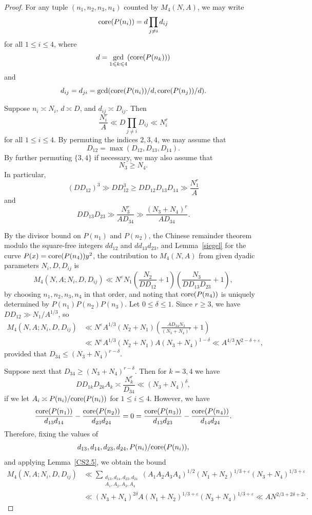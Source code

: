 \documentclass[reqno, 12pt]{amsart}
\theoremstyle{plain}
\theoremstyle{definition}
\theoremstyle{remark}
\renewcommand{\le}{\leqslant}
\renewcommand{\ge}{\geqslant}
\newcommand{\co}{\textnormal{core}}
\begin{document}
\begin{proof}
For any tuple $(n_1,n_2,n_3,n_4)$ counted by $M_4(N,A)$, we may write
$$\co(P(n_i)) = d \prod_{j\ne i} d_{ij}$$
for all $1\le i\le 4$,
where $$d = \gcd_{1\le k\le 4}(\co(P(n_k)))$$
and $$d_{ij} = d_{ji} = \gcd(\co(P(n_i))/d, \co(P(n_j))/d).$$

Suppose $n_i\asymp N_i$, $d\asymp D$, and $d_{ij}\asymp D_{ij}$.
Then $$\frac{N_i^r}{A} \ll D \prod_{j\ne i} D_{ij} \ll N_i^r$$
for all $1\le i\le 4$.
By permuting the indices $2,3,4$, we may assume that
$$D_{12} = \max(D_{12},D_{13},D_{14}).$$
By further permuting $\{3,4\}$ if necessary, we may also assume that
$$N_3 \ge N_4.$$
In particular,
$$(D D_{12})^3
\gg D D_{12}^3
\ge D D_{12} D_{13} D_{14} \gg \frac{N_1^r}{A}$$
and
$$DD_{13}D_{23} \gg \frac{N_3^r}{A D_{34}}
\gg \frac{(N_3+N_4)^r}{A D_{34}}.$$


By the divisor bound
on $P(n_1)$ and $P(n_2)$,
the Chinese remainder theorem modulo the square-free integers
$dd_{12}$ and $dd_{13}d_{23}$,
and Lemma~\ref{siegel} for the curve
$P(x) = \co(P(n_4)) y^2$,
the contribution to $M_4(N,A)$ from given dyadic parameters $N_i,D,D_{ij}$ is
$$M_4(N,A;N_i,D,D_{ij})
\ll N^\varepsilon N_1
\left(\frac{N_2}{DD_{12}} + 1\right)
\left(\frac{N_3}{DD_{13}D_{23}} + 1\right),$$
by choosing $n_1,n_2,n_3,n_4$ in that order,
and noting that $\co(P(n_4))$ is uniquely determined by $P(n_1)P(n_2)P(n_3)$.
Let $0\le \delta\le 1$.
Since $r\ge 3$, we have $DD_{12} \gg N_1/A^{1/3}$, so
\begin{equation*}
\begin{split}
M_4(N,A;N_i,D,D_{ij})
&\ll N^\varepsilon A^{1/3} (N_2 + N_1)
\left(\frac{AD_{34}N_3}{(N_3+N_4)^r} + 1\right) \\
&\ll N^\varepsilon A^{1/3} (N_2 + N_1)
A(N_3+N_4)^{1-\delta}
\ll A^{4/3} N^{2-\delta+\varepsilon},
\end{split}
\end{equation*}
provided that $D_{34} \le (N_3+N_4)^{r-\delta}$.

Suppose next that $D_{34} \ge (N_3+N_4)^{r-\delta}$.
Then for $k=3,4$ we have $$DD_{1k}D_{2k}A_k \asymp \frac{N_k^r}{D_{34}}
\ll (N_3+N_4)^\delta,$$
if we let $A_i \asymp P(n_i)/\co(P(n_i))$ for $1\le i\le 4$.
However, we have
$$\frac{\co(P(n_1))}{d_{13}d_{14}} - \frac{\co(P(n_2))}{d_{23}d_{24}}
= 0
= \frac{\co(P(n_3))}{d_{13}d_{23}} - \frac{\co(P(n_4))}{d_{14}d_{24}}.$$
Therefore,
fixing the values of
$$d_{13},d_{14},d_{23},d_{24},P(n_i)/\co(P(n_i)),$$
and applying Lemma~\ref{CS2.5},
we obtain the bound
\begin{equation*}
\begin{split}
M_4(N,A;N_i,D,D_{ij})
&\ll \sum_{\substack{d_{13},d_{14},d_{23},d_{24} \\
A_1,A_2,A_3,A_4}} (A_1A_2A_3A_4)^{1/2}
(N_1+N_2)^{1/3+\varepsilon} (N_3+N_4)^{1/3+\varepsilon} \\
&\ll (N_3+N_4)^{2\delta} A
(N_1+N_2)^{1/3+\varepsilon} (N_3+N_4)^{1/3+\varepsilon}
\ll A N^{2/3+2\delta+2\varepsilon}.
\end{split}
\end{equation*}


\end{proof}
\end{document}

